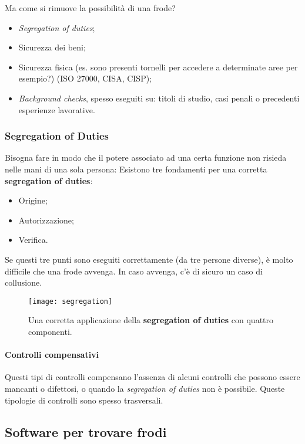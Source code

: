 Ma come si rimuove la possibilità di una frode?
\begin{itemize}
  \item \textit{Segregation of duties};
  \item Sicurezza dei beni;
  \item Sicurezza fisica (es. sono presenti tornelli per accedere a determinate
aree per esempio?) (ISO 27000, CISA, CISP);
  \item \textit{Background checks}, spesso eseguiti su: titoli di studio,
  casi penali o precedenti esperienze lavorative.
\end{itemize}

\subsubsection{Segregation of Duties}

Bisogna fare in modo che il potere associato ad una certa funzione non risieda
nelle mani di una sola persona:
Esistono tre fondamenti per una corretta \textbf{segregation of duties}:
\begin{itemize}
  \item Origine;
  \item Autorizzazione;
  \item Verifica.
\end{itemize}

Se questi tre punti sono eseguiti correttamente (da tre persone diverse),
è molto difficile che una frode avvenga.
In caso avvenga, c'è di sicuro un caso di collusione.

\begin{figure}[H]
 \centering
 \texttt{[image: segregation]}
 \caption{Una corretta applicazione della \textbf{segregation of duties} con
quattro componenti.}
\end{figure}


\paragraph*{Controlli compensativi}

Questi tipi di controlli compensano l'assenza di alcuni controlli che possono
essere mancanti o difettosi, o quando la \textit{segregation of duties} non è
possibile. Queste tipologie di controlli sono spesso trasversali.

\subsection{Software per trovare frodi}

